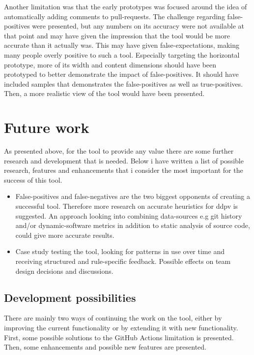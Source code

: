 \documentclass{report}
\begin{document}
Another limitation was that the early prototypes was focused around the idea of automatically adding comments to pull-requests. The challenge regarding false-positives were presented, but any numbers on its accuracy were not available at that point and may have given the impression that the tool would be more accurate than it actually was. This may have given false-expectations, making many people overly positive to such a tool. Especially targeting the horizontal prototype, more of its width and content dimensions should have been prototyped to better demonstrate the impact of false-positives. It should have included samples that demonstrates the false-positives as well as true-positives. Then, a more realistic view of the tool would have been presented.



\section{Future work}
 As presented above, for the tool to provide any value there are some further research and development that is needed. Below i have written a list of possible research, features and enhancements that i consider the most important for the success of this tool. 
 


\begin{itemize}
    \item False-positives and false-negatives are the two biggest opponents of creating a successful tool. Therefore more research on accurate heuristics for \gls{ddpv} is suggested. An approach looking into combining data-sources e.g git history and/or dynamic-software metrics in addition to static analysis of source code, could give more accurate results. 
    
    \item Case study testing the tool, looking for patterns in use over time and receiving structured and rule-specific feedback. Possible effects on team design decisions and discussions.   
\end{itemize}


\subsection{Development possibilities}
There are mainly two ways of continuing the work on the tool, either by improving the current functionality or by extending it with new functionality. First, some possible solutions to the GitHub Actions limitation is presented. Then, some enhancements and possible new features are presented.
\end{document}
